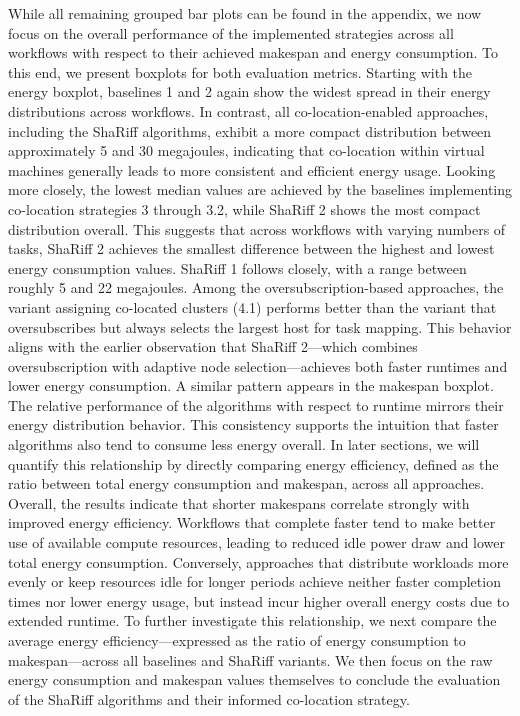 While all remaining grouped bar plots can be found in the appendix, we now focus on the overall performance of the implemented strategies across all workflows with respect to their achieved makespan and energy consumption. To this end, we present boxplots for both evaluation metrics.
Starting with the energy boxplot, baselines 1 and 2 again show the widest spread in their energy distributions across workflows. In contrast, all co-location-enabled approaches, including the ShaRiff algorithms, exhibit a more compact distribution between approximately 5 and 30 megajoules, indicating that co-location within virtual machines generally leads to more consistent and efficient energy usage. Looking more closely, the lowest median values are achieved by the baselines implementing co-location strategies 3 through 3.2, while ShaRiff 2 shows the most compact distribution overall. This suggests that across workflows with varying numbers of tasks, ShaRiff 2 achieves the smallest difference between the highest and lowest energy consumption values. ShaRiff 1 follows closely, with a range between roughly 5 and 22 megajoules. Among the oversubscription-based approaches, the variant assigning co-located clusters (4.1) performs better than the variant that oversubscribes but always selects the largest host for task mapping. This behavior aligns with the earlier observation that ShaRiff 2—which combines oversubscription with adaptive node selection—achieves both faster runtimes and lower energy consumption.
A similar pattern appears in the makespan boxplot. The relative performance of the algorithms with respect to runtime mirrors their energy distribution behavior. This consistency supports the intuition that faster algorithms also tend to consume less energy overall. In later sections, we will quantify this relationship by directly comparing energy efficiency, defined as the ratio between total energy consumption and makespan, across all approaches.
Overall, the results indicate that shorter makespans correlate strongly with improved energy efficiency. Workflows that complete faster tend to make better use of available compute resources, leading to reduced idle power draw and lower total energy consumption. Conversely, approaches that distribute workloads more evenly or keep resources idle for longer periods achieve neither faster completion times nor lower energy usage, but instead incur higher overall energy costs due to extended runtime.
To further investigate this relationship, we next compare the average energy efficiency—expressed as the ratio of energy consumption to makespan—across all baselines and ShaRiff variants. We then focus on the raw energy consumption and makespan values themselves to conclude the evaluation of the ShaRiff algorithms and their informed co-location strategy.

